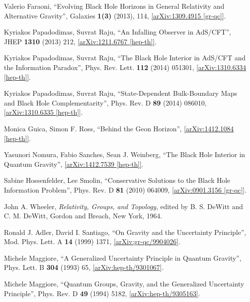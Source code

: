 \documentclass[12pt]{article}
\newcommand{\2}{$^2$}
\newcommand{\3}{$^3$}
\newcommand{\4}{$_4$}
\newcommand{\5}{$_5$}
\begin{document}
\begin{thebibliography}{400}
Valerio Faraoni, ``Evolving Black Hole Horizons in General Relativity and Alternative Gravity'', Galaxies \textbf{1(3)} (2013), 114, \href{http://arxiv.org/abs/1309.4915}{[arXiv:1309.4915 [gr-qc]]}.

Kyriakos Papadodimas, Suvrat Raju, ``An Infalling Observer in AdS/CFT'', JHEP \textbf{1310} (2013) 212,
\href{http://arxiv.org/abs/1211.6767}{[arXiv:1211.6767 [hep-th]]}.

Kyriakos Papadodimas, Suvrat Raju, ``The Black Hole Interior in AdS/CFT and the Information Paradox'', Phys. Rev. Lett. \textbf{112} (2014) 051301, \href{http://arxiv.org/abs/1310.6334}{[arXiv:1310.6334 [hep-th]]}.

Kyriakos Papadodimas, Suvrat Raju, ``State-Dependent Bulk-Boundary Maps and Black Hole Complementarity'', Phys. Rev. D \textbf{89} (2014) 086010, \href{http://arxiv.org/abs/1310.6335}{[arXiv:1310.6335 [hep-th]]}.

Monica Guica, Simon F. Ross, ``Behind the Geon Horizon'', \href{http://arxiv.org/abs/1412.1084}{[arXiv:1412.1084 [hep-th]]}.

Yasunori Nomura, Fabio Sanches, Sean J. Weinberg, ``The Black Hole Interior in Quantum Gravity'', \href{http://arxiv.org/abs/1412.7539}{[arXiv:1412.7539 [hep-th]]}.


 Sabine Hossenfelder, Lee Smolin, ``Conservative Solutions to the Black Hole Information Problem'', Phys. Rev. D \textbf{81} (2010) 064009, \href{http://arxiv.org/abs/0901.3156}{[arXiv:0901.3156 [gr-qc]]}. 




John A. Wheeler, \emph{Relativity, Groups, and Topology}, edited by B. S. DeWitt and C. M. DeWitt, Gordon and Breach, New York, 1964.





 Ronald J. Adler, David I. Santiago, ``On Gravity and the Uncertainty Principle'', Mod. Phys. Lett. A \textbf{14} (1999) 1371, \href{http://arxiv.org/abs/gr-qc/9904026}{	[arXiv:gr-qc/9904026]}. 

 Michele Maggiore, ``A Generalized Uncertainty Principle in Quantum Gravity'', Phys. Lett. B \textbf{304} (1993) 65, \href{http://arxiv.org/abs/hep-th/9301067}{[arXiv:hep-th/9301067]}.

 Michele Maggiore, ``Quantum Groups, Gravity, and the Generalized Uncertainty Principle'', Phys. Rev. D \textbf{49} (1994) 5182, \href{http://arxiv.org/abs/hep-th/9305163}{[arXiv:hep-th/9305163]}. 


\end{thebibliography}
\end{document}
